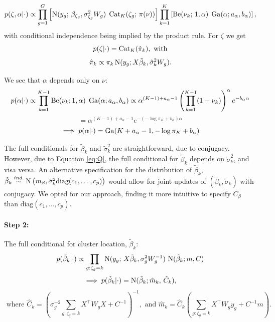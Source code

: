 {\begin{equation}
p(\zeta, \alpha|\cdot) \propto \prod_{g=1}^G \left[ \operatorname{N}(y_g;\,\beta_{\zeta_g},\sigma^2_{\zeta_g}W_g)\; \operatorname{Cat}_K(\zeta_g;\, \pi(\nu)) \right] \prod_{k=1}^K \left[ \operatorname{Be}(\nu_k;\, 1, \alpha)\; \operatorname{Ga}(\alpha;a_\alpha,b_\alpha)\right],
\end{equation}
with conditional independence being implied by the product rule. For $\zeta$ we get
\begin{equation}
\label{zetafull}
p(\zeta|\cdot) = \operatorname{Cat}_K(\hat{\pi}_k), \mbox{ with}
\end{equation}
\begin{equation*}
\hat{\pi}_k \propto \pi_k \operatorname{N}(y_g;X\tilde{\beta}_k,\tilde{\sigma}_k^2 W_g).
\end{equation*}

We see that $\alpha$ depends only on $\nu$:
\begin{equation}
    p(\alpha|\cdot) \propto \prod_{k=1}^{K-1} \operatorname{Be}(\nu_k;1, \alpha) \; \operatorname{Ga}(\alpha;a_\alpha,b_\alpha)
\propto \alpha^{(K-1) + a_\alpha - 1} \left(\prod_{k=1}^{K-1} (1-\nu_k)\right)^\alpha e^{-b_\alpha \alpha} 
  \end{equation}
  \begin{equation*}
    = \alpha^{(K-1) + a_\alpha - 1} e^{-(-\log \pi_K + b_\alpha) \alpha}
  \end{equation*}
  \begin{equation*}
    \implies p(\alpha|\cdot) = \operatorname{Ga}(K + a_\alpha - 1, -\log \pi_K + b_\alpha)
  \end{equation*}



The full conditionals for $\tilde{\beta}_k$ and $\tilde{\sigma}^2_k$ are straightforward, due to conjugacy. However, due to Equation \ref{eq:Q}, the full conditional for $\tilde{\beta}_k$ depends on $\tilde{\sigma}^2_k$, and visa versa. An alternative specification for the distribution of $\tilde{\beta}_k$, $\tilde{\beta}_k \stackrel{ind.}{\sim} \operatorname{N}\left(m_\beta, \tilde{\sigma}^2_k \mbox{diag}(c_1,\ldots,c_p)\right)$ would allow for joint updates of $(\tilde{\beta}_k,\tilde{\sigma}_k)$ with conjugacy. We opted for our approach, finding it more intuitive to specify $C_\beta$ than $\mbox{diag}(c_1,\ldots,c_p)$.

\paragraph{Step 2:} 
The full conditional for cluster location, $\tilde{\beta}_k$:
    \begin{equation}
      p(\tilde{\beta}_k|\cdot) \propto \prod_{g:\zeta_g=k} \operatorname{N}(y_g;\,X\tilde{\beta}_k, \sigma^2_gW^{-1}_g)\,\operatorname{N}(\tilde{\beta}_k; m, C)
    \end{equation}
    \begin{equation*}
      \implies p(\tilde{\beta}_k|\cdot) = \operatorname{N}(\tilde{\beta}_k; \hat{m}_k,\, \hat{C}_k),
    \end{equation*}
    \begin{equation*}
    \mbox{ where }\hat{C}_k= \left( \sigma^{-2}_g\sum_{g:\zeta_g=k}
      X^\top W_g X + C^{-1} \right)^{-1}, \mbox{ and
    }\hat{m}_k=\hat{C}_k \left(\sum_{g:\zeta_g=k} X^\top W_g y_g +
      C^{-1}m \right).
    \end{equation*}
}
